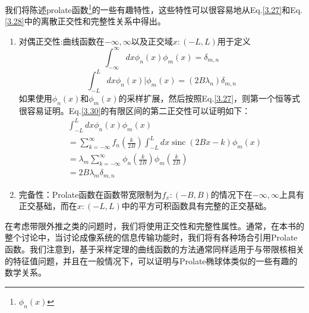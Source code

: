 \documentclass[12pt, UTF8]{ctexart}%
\numberwithin{equation}{section}
\numberwithin{figure}{section}
\newcommand{\InsertEqution}[2]{\begin{equation}
  \label{#1}
   #2
 \end{equation}}
\newcommand{\RefEq}[1]{Eq.\ref{#1}}
\newcommand{\InsertInlineEq}[1]{$#1$}
\newcommand{\InsertItem}[1]{\begin{enumerate} #1 \end{enumerate}}
\begin{document}
\begin{sloppypar}
我们将陈述prolate函数\footnote{\InsertInlineEq{\phi_n(x)}}的一些有趣特性，这些特性可以很容易地从\RefEq{3.27}和\RefEq{3.28}中的离散正交性和完整性关系中得出。
\InsertItem{\item 对偶正交性:曲线函数在\InsertInlineEq{-\infty,\infty}以及正交域\InsertInlineEq{x:(-L,L)}用于定义\InsertEqution{3.29}{\int_{-\infty}^{\infty} d x \phi_{n}(x) \phi_{m}(x)=\delta_{m, n}}
\InsertEqution{3.30}{\int_{-L}^{L}d x \phi_{n}(x) | \phi_{m}(x)=\left(2 B \lambda_{n}\right) \delta_{m, n}}
如果使用\InsertInlineEq{\phi_n(x)}和\InsertInlineEq{\phi_m(x)}的采样扩展，然后按照\RefEq{3.27}，则第一个恒等式很容易证明。\RefEq{3.30}的有限区间的第二正交性可以证明如下：\InsertEqution{3.31}{\begin{aligned}
  &\int_{-L}^{L} d x \phi_{n}(x) \phi_{m}(x) \\
  &=\sum\limits_{k=-\infty}^{\infty} f_{n}\left(\frac{k}{2 B}\right) \int_{-L}^{L} d x \operatorname{sinc}(2 B x-k) \phi_{m}(x) \\
  &=\lambda_{m} \sum\limits_{k=-\infty}^{\infty} \phi_{n}\left(\frac{k}{2 B}\right) \phi_{m}\left(\frac{k}{2 B}\right) \\
 & =2 B \lambda_{m} \delta_{m, n}
  \end{aligned}}
  \item 完备性：Prolate函数在函数带宽限制为\InsertInlineEq{f_x:(-B,B)}的情况下在\InsertInlineEq{-\infty,\infty}上具有正交基础，而在\InsertInlineEq{x:(-L,L)}中的平方可积函数具有完整的正交基础。}


  在考虑带限外推之类的问题时，我们将使用正交性和完整性属性。通常，在本书的整个讨论中，当讨论成像系统的信息传输功能时，我们将有各种场合引用Prolate函数。我们注意到，基于采样定理的曲线函数的方法通常同样适用于与带限核相关的特征值问题，并且在一般情况下，可以证明与Prolate椭球体类似的一些有趣的数学关系。

\end{sloppypar}
\end{document}
